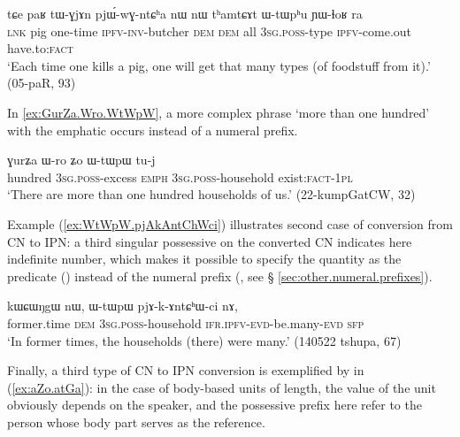 \begin{exe}
\ex \label{ex:nW.thamtCAt.WtWphu}
 \gll tɕe paʁ tɯ-ɣjɤn pjɯ́-wɣ-ntɕʰa nɯ nɯ tʰamtɕɤt ɯ-tɯpʰu ɲɯ-ɬoʁ ra \\ 
 \textsc{lnk} pig one-time \textsc{ipfv}-\textsc{inv}-butcher \textsc{dem} \textsc{dem} all \textsc{3sg}.\textsc{poss}-type \textsc{ipfv}-come.out have.to:\textsc{fact} \\
\glt `Each time one kills a pig, one will get that many types (of foodstuff from it).' (05-paR, 93)
\end{exe}

In \ref{ex:GurZa.Wro.WtWpW}, a more complex phrase  `more than one hundred' with the emphatic  occurs instead of a numeral prefix.

\begin{exe}
\ex \label{ex:GurZa.Wro.WtWpW}
 \gll ɣurʑa ɯ-ro ʑo ɯ-tɯpɯ tu-j \\
 hundred \textsc{3sg}.\textsc{poss}-excess \textsc{emph} \textsc{3sg}.\textsc{poss}-household exist:\textsc{fact}-\textsc{1pl} \\
\glt `There are more than one hundred households of us.' (22-kumpGatCW, 32)
\end{exe}

Example (\ref{ex:WtWpW.pjAkAntChWci}) illustrates second case of conversion from CN to IPN: a third singular possessive on the converted CN indicates here indefinite number, which makes it possible to specify the quantity as the predicate () instead of the numeral prefix (, see § \ref{sec:other.numeral.prefixes}).

\begin{exe}
\ex \label{ex:WtWpW.pjAkAntChWci}
 \gll kɯɕɯŋgɯ nɯ, ɯ-tɯpɯ pjɤ-k-ɤntɕʰɯ-ci nɤ, \\
 former.time \textsc{dem} \textsc{3sg}.\textsc{poss}-household \textsc{ifr}.\textsc{ipfv}-\textsc{evd}-be.many-\textsc{evd} \textsc{sfp} \\
\glt `In former times, the households (there) were many.' (140522 tshupa, 67)
\end{exe}

Finally, a third type of CN to IPN conversion is exemplified by  in (\ref{ex:aZo.atGa}): in the case of body-based units of length, the value of the unit obviously depends on the speaker, and the possessive prefix here refer to the person whose body part serves as the reference.

